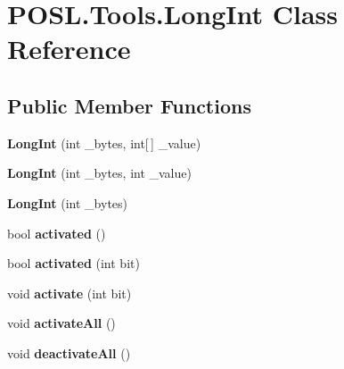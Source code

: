 \hypertarget{classPOSL_1_1Tools_1_1LongInt}{}\section{P\+O\+S\+L.\+Tools.\+Long\+Int Class Reference}
\label{classPOSL_1_1Tools_1_1LongInt}
\subsection*{Public Member Functions}
\begin{DoxyCompactItemize}
\item 
\mbox{\label{classPOSL_1_1Tools_1_1LongInt_ac760ee8fc21b9624229255fc27698903}} 
{\bfseries Long\+Int} (int \+\_\+bytes, int\mbox{[}$\,$\mbox{]} \+\_\+value)
\item 
\mbox{\label{classPOSL_1_1Tools_1_1LongInt_a52106799c2af1366abbecd6fe1fd1272}} 
{\bfseries Long\+Int} (int \+\_\+bytes, int \+\_\+value)
\item 
\mbox{\label{classPOSL_1_1Tools_1_1LongInt_a6ca4833858e9cc3a60629aadefc1f041}} 
{\bfseries Long\+Int} (int \+\_\+bytes)
\item 
\mbox{\label{classPOSL_1_1Tools_1_1LongInt_aa1ad5c9aee846670b7af608a397675b9}} 
bool {\bfseries activated} ()
\item 
\mbox{\label{classPOSL_1_1Tools_1_1LongInt_add69f1fe0606fb43a26247ce8a66d2fc}} 
bool {\bfseries activated} (int bit)
\item 
\mbox{\label{classPOSL_1_1Tools_1_1LongInt_a7924ccf65097b41d50640722268b1124}} 
void {\bfseries activate} (int bit)
\item 
\mbox{\label{classPOSL_1_1Tools_1_1LongInt_ad2eecb88d41d6887b0958973a7364d39}} 
void {\bfseries activate\+All} ()
\item 
\mbox{\label{classPOSL_1_1Tools_1_1LongInt_ad8b23ce2d91ab32a676403666bb195d5}} 
void {\bfseries deactivate\+All} ()

\end{DoxyCompactItemize}
